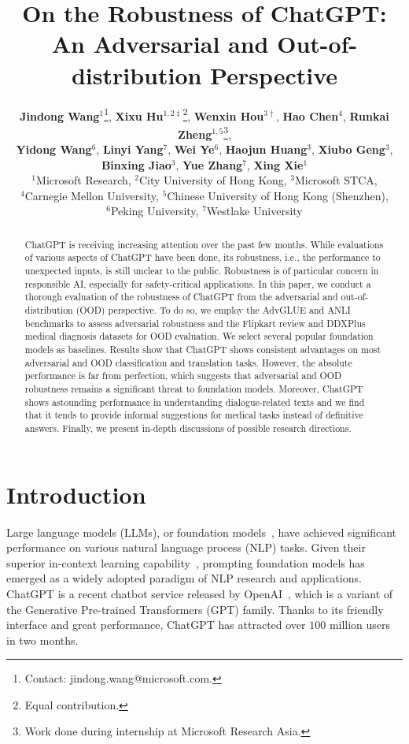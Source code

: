 \documentclass[11pt]{article}
\title{On the Robustness of ChatGPT: An Adversarial and Out-of-distribution Perspective}
\author{%
  \textbf{Jindong Wang}$^{1}$\thanks{Contact: jindong.wang@microsoft.com.}, \textbf{Xixu Hu}$^{1,2\ddagger}$\thanks{Equal contribution.}, \textbf{Wenxin Hou}$^{3\dagger}$, \textbf{Hao Chen}$^{4}$, \textbf{Runkai Zheng}$^{1,5}$\thanks{Work done during internship at Microsoft Research Asia.}, \\\textbf{Yidong Wang}$^{6}$, \textbf{Linyi Yang}$^{7}$, \textbf{Wei Ye}$^{6}$, \textbf{Haojun Huang}$^{3}$, \textbf{Xiubo Geng}$^{3}$, \\\textbf{Binxing Jiao}$^{3}$, \textbf{Yue Zhang}$^{7}$, \textbf{Xing Xie}$^{1}$\\
  $^{1}$Microsoft Research, $^{2}$City University of Hong Kong, $^{3}$Microsoft STCA, \\$^{4}$Carnegie Mellon University, $^{5}$Chinese University of Hong Kong (Shenzhen), \\$^{6}$Peking University, $^{7}$Westlake University
}
\newcommand{\chat}{ChatGPT\xspace}
\newcommand{\advglue}{AdvGLUE\xspace}
\newcommand{\ddx}{DDXPlus\xspace}
\begin{document}
\maketitle


\begin{abstract}

\chat is receiving increasing attention over the past few months.
While evaluations of various aspects of \chat have been done, its robustness, i.e., the performance to unexpected inputs, is still unclear to the public.
Robustness is of particular concern in responsible AI, especially for safety-critical applications.
In this paper, we conduct a thorough evaluation of the robustness of \chat from the adversarial and out-of-distribution (OOD) perspective.
To do so, we employ the \advglue and ANLI benchmarks to assess adversarial robustness and the Flipkart review and \ddx medical diagnosis datasets for OOD evaluation.
We select several popular foundation models as baselines.
Results show that \chat shows consistent advantages on most adversarial and OOD classification and translation tasks.
However, the absolute performance is far from perfection, which suggests that adversarial and OOD robustness remains a significant threat to foundation models.
Moreover, \chat shows astounding performance in understanding dialogue-related texts and we find that it tends to provide informal suggestions for medical tasks instead of definitive answers.
Finally, we present in-depth discussions of possible research directions.

\end{abstract}

\section{Introduction}
\label{sec-intro}

Large language models (LLMs), or foundation models~\cite{bommasani2021opportunities}, have achieved significant performance on various natural language process (NLP) tasks.
Given their superior in-context learning capability~\cite{min2022rethinking}, prompting foundation models has emerged as a widely adopted paradigm of NLP research and applications.
\chat is a recent chatbot service released by OpenAI~\cite{chatgpt}, which is a variant of the Generative Pre-trained Transformers (GPT) family.
Thanks to its friendly interface and great performance, \chat has attracted over $100$ million users in two months.
\end{document}
